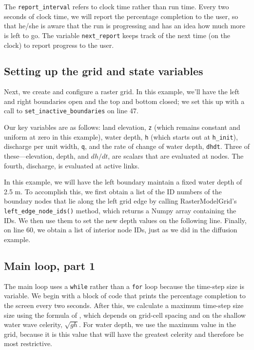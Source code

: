 \documentclass[12pt]{article}
\newcommand{\code}[1]{{\tt #1}}
\begin{document}
The \code{report\_interval} refers to clock time rather than run time. Every two seconds of clock time, we will report the percentage completion to the user, so that he/she is aware that the run is progressing and has an idea how much more is left to go. The variable \code{next\_report} keeps track of the next time (on the clock) to report progress to the user.

\newpage
\subsection{Setting up the grid and state variables}



Next, we create and configure a raster grid. In this example, we'll have the left and right boundaries open and the top and bottom closed; we set this up with a call to \code{set\_inactive\_boundaries} on line 47.

Our key variables are as follows: land elevation, \code{z} (which remains constant and uniform at zero in this example), water depth, \code{h} (which starts out at \code{h\_init}), discharge per unit width, \code{q}, and the rate of change of water depth, \code{dhdt}. Three of these---elevation, depth, and $dh/dt$, are scalars that are evaluated at nodes. The fourth, discharge, is evaluated at active links.

In this example, we will have the left boundary maintain a fixed water depth of 2.5 m. To accomplish this, we first obtain a list of the ID numbers of the boundary nodes that lie along the left grid edge by calling RasterModelGrid's \code{left\_edge\_node\_ids()} method, which returns a Numpy array containing the IDs. We then use them to set the new depth values on the following line. Finally, on line 60, we obtain a list of interior node IDs, just as we did in the diffusion example.

\subsection{Main loop, part 1}



The main loop uses a \code{while} rather than a \code{for} loop because the time-step size is variable. We begin with a block of code that prints the percentage completion to the screen every two seconds. After this, we calculate a maximum time-step size size using the formula of \citet{bates2010simple}, which depends on grid-cell spacing and on the shallow water wave celerity, $\sqrt{g h}$. For water depth, we use the maximum value in the grid, because it is this value that will have the greatest celerity and therefore be most restrictive.
\end{document}
